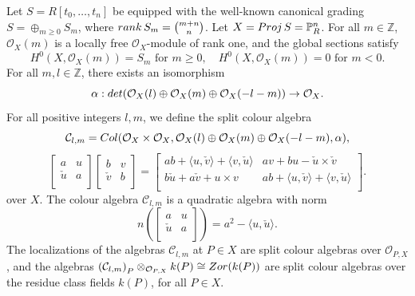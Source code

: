 \documentclass[10pt]{amsart}
\theoremstyle{plain}
\theoremstyle{definition}
\begin{document}
Let $S=R[t_0,\dots,t_n]$ be  equipped with the well-known canonical grading $S=\oplus_{m\geq 0}S_m$, where ${\rm rank}\, S_m=\binom{m+n}{n}$. Let $X={\rm Proj}\,S=\mathbb{P}_R^n$.
For all $m\in \mathbb{Z}$, $\mathcal{O}_X(m)$ is a locally free $\mathcal{O}_X$-module of rank one, and the global sections satisfy
$$H^0(X,\mathcal{O}_X(m))=S_m \text{ for }m\geq 0,\quad H^0(X,\mathcal{O}_X(m))=0 \text{ for }m< 0.$$
For all $m,l\in \mathbb{Z}$, there exists an isomorphism
$$\alpha:{\rm det}(\mathcal{O}_X(l)\oplus \mathcal{O}_X(m)\oplus \mathcal{O}_X(-l-m))\rightarrow \mathcal{O}_X.$$
For all positive integers  $l,m$, we define  the split colour algebra
$$\mathcal{C}_{l,m}={\rm Col}(\mathcal{O}_X\times \mathcal{O}_X, \mathcal{O}_X(l)\oplus \mathcal{O}_X(m)
\oplus \mathcal{O}_X(-l-m),\alpha),$$
$$
\left [\begin {array}{cc}
 a & u\\
\check{u}  &  a \\
\end {array}\right ]
\left [\begin {array}{cc}
 b & v\\
\check{v}  &  b \\
\end {array}\right ]
=
\left [\begin {array}{cc}
  ab+\langle u,\check{v}\rangle + \langle v,\check{u}\rangle & av+bu-\check{u}\times \check{v}\\
b\check{u} +a\check{v}+u\times v &  ab+\langle u,\check{v}\rangle + \langle v,\check{u}\rangle \\
\end {array}\right ].
$$
 over $X$. The colour algebra $\mathcal{C}_{l,m}$ is a quadratic algebra  with norm
 $$
n(
\left [\begin {array}{cc}
 a & u\\
\check{u}  &  a \\
\end {array}\right ])=
a^2-\langle u,\check{u}\rangle.$$
The localizations of the algebras $\mathcal{C}_{l,m}$ at $P\in X$ are split colour algebras over $\mathcal{O}_{P,X}$, and the algebras ${(\mathcal{C}_{l,m})}_P\otimes_{\mathcal{O}_{P,X}} k(P)\cong {\rm Zor}(k(P))$ are split colour algebras over the residue class fields $k(P)$, for all $P\in X$.
\end{document}
